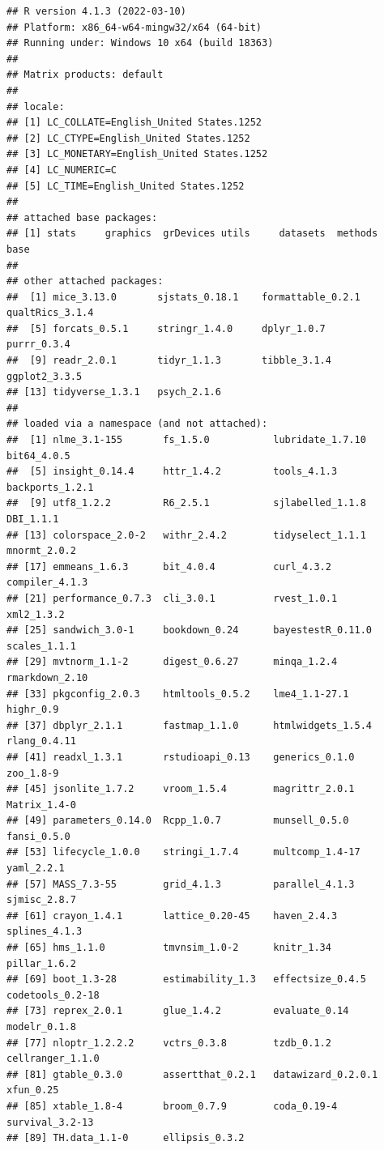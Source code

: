 \documentclass[
]{book}
\begin{document}
\begin{verbatim}
## R version 4.1.3 (2022-03-10)
## Platform: x86_64-w64-mingw32/x64 (64-bit)
## Running under: Windows 10 x64 (build 18363)
## 
## Matrix products: default
## 
## locale:
## [1] LC_COLLATE=English_United States.1252 
## [2] LC_CTYPE=English_United States.1252   
## [3] LC_MONETARY=English_United States.1252
## [4] LC_NUMERIC=C                          
## [5] LC_TIME=English_United States.1252    
## 
## attached base packages:
## [1] stats     graphics  grDevices utils     datasets  methods   base     
## 
## other attached packages:
##  [1] mice_3.13.0       sjstats_0.18.1    formattable_0.2.1 qualtRics_3.1.4  
##  [5] forcats_0.5.1     stringr_1.4.0     dplyr_1.0.7       purrr_0.3.4      
##  [9] readr_2.0.1       tidyr_1.1.3       tibble_3.1.4      ggplot2_3.3.5    
## [13] tidyverse_1.3.1   psych_2.1.6      
## 
## loaded via a namespace (and not attached):
##  [1] nlme_3.1-155       fs_1.5.0           lubridate_1.7.10   bit64_4.0.5       
##  [5] insight_0.14.4     httr_1.4.2         tools_4.1.3        backports_1.2.1   
##  [9] utf8_1.2.2         R6_2.5.1           sjlabelled_1.1.8   DBI_1.1.1         
## [13] colorspace_2.0-2   withr_2.4.2        tidyselect_1.1.1   mnormt_2.0.2      
## [17] emmeans_1.6.3      bit_4.0.4          curl_4.3.2         compiler_4.1.3    
## [21] performance_0.7.3  cli_3.0.1          rvest_1.0.1        xml2_1.3.2        
## [25] sandwich_3.0-1     bookdown_0.24      bayestestR_0.11.0  scales_1.1.1      
## [29] mvtnorm_1.1-2      digest_0.6.27      minqa_1.2.4        rmarkdown_2.10    
## [33] pkgconfig_2.0.3    htmltools_0.5.2    lme4_1.1-27.1      highr_0.9         
## [37] dbplyr_2.1.1       fastmap_1.1.0      htmlwidgets_1.5.4  rlang_0.4.11      
## [41] readxl_1.3.1       rstudioapi_0.13    generics_0.1.0     zoo_1.8-9         
## [45] jsonlite_1.7.2     vroom_1.5.4        magrittr_2.0.1     Matrix_1.4-0      
## [49] parameters_0.14.0  Rcpp_1.0.7         munsell_0.5.0      fansi_0.5.0       
## [53] lifecycle_1.0.0    stringi_1.7.4      multcomp_1.4-17    yaml_2.2.1        
## [57] MASS_7.3-55        grid_4.1.3         parallel_4.1.3     sjmisc_2.8.7      
## [61] crayon_1.4.1       lattice_0.20-45    haven_2.4.3        splines_4.1.3     
## [65] hms_1.1.0          tmvnsim_1.0-2      knitr_1.34         pillar_1.6.2      
## [69] boot_1.3-28        estimability_1.3   effectsize_0.4.5   codetools_0.2-18  
## [73] reprex_2.0.1       glue_1.4.2         evaluate_0.14      modelr_0.1.8      
## [77] nloptr_1.2.2.2     vctrs_0.3.8        tzdb_0.1.2         cellranger_1.1.0  
## [81] gtable_0.3.0       assertthat_0.2.1   datawizard_0.2.0.1 xfun_0.25         
## [85] xtable_1.8-4       broom_0.7.9        coda_0.19-4        survival_3.2-13   
## [89] TH.data_1.1-0      ellipsis_0.3.2
\end{verbatim}
\end{document}
